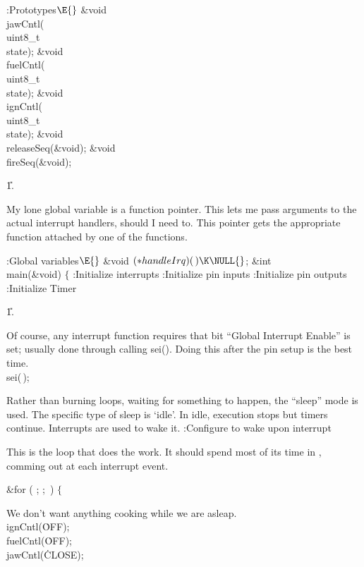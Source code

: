 \B{}:Prototypes\X${}\E{}$\6
\&{void} \\{jawCntl}(\\{uint8\_t}\\{state});\6
\&{void} \\{fuelCntl}(\\{uint8\_t}\\{state});\6
\&{void} \\{ignCntl}(\\{uint8\_t}\\{state});\6
\&{void} \\{releaseSeq}(\&{void});\6
\&{void} \\{fireSeq}(\&{void});\par
\U1.\fi

My lone global variable is a function pointer.
This lets me pass arguments to the actual interrupt handlers, should I need to.
This pointer gets the appropriate function attached by one of the 
functions.

\Y\B\4:Global variables\X${}\E{}$\6
\&{void} ${}({*}\\{handleIrq})(\,)\K\NULL{}$;\6
\&{int} \\{main}(\&{void})\1\1\6
$\{{}$\6
:Initialize interrupts\X\6
:Initialize pin inputs\X\6
:Initialize pin outputs\X\6
:Initialize Timer\X\par
\U1.\fi

Of course, any interrupt function requires that bit ``Global Interrupt Enable''
is set; usually done through calling sei(). Doing this after the pin setup is
the best time.
\Y\B\\{sei}(\,);\par
\fi

Rather than burning loops, waiting for something to happen,
the ``sleep'' mode is used.
The specific type of sleep is `idle'.
In idle, execution stops but timers continue.
Interrupts are used to wake it.
\Y\B{}:Configure to wake upon interrupt\X\par
\fi

This is the loop that does the work.
It should spend most of its time in ,
comming out at each interrupt event.

\Y\B\&{for} ( ;  ; \,)\6
$\{{}$\par
\fi

We don't want anything cooking while we are asleap.
\Y\B\\{ignCntl}(\.{OFF});\6
\\{fuelCntl}(\.{OFF});\6
\\{jawCntl}(\.{CLOSE});\par
\fi


